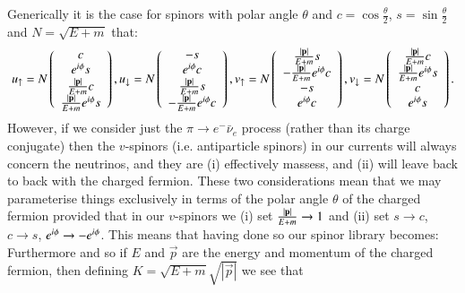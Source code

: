 \begin{allparts}
Generically it is the case for spinors with polar angle $\theta$ and $c=\cos{\frac \theta 2}$, $s=\sin {\frac \theta 2}$ and $N=\sqrt{E+m}$ that:
$$
u_\uparrow =N\left(\begin{array}{c} c \\ e^{i\phi} s \\ \frac{|{\bf p}|}{E+m} c \\ \frac{|{\bf p}|}{E+m} e^{i\phi} s \end{array}\right),
u_\downarrow=N\left(\begin{array}{c} -s \\ e^{i\phi} c \\ \frac{|{\bf p}|}{E+m} s \\ -\frac{|{\bf p}|}{E+m} e^{i\phi} c \end{array}\right),
v_\uparrow =N\left(\begin{array}{c} \frac{|{\bf p}|}{E+m} s \\ -\frac{|{\bf p}|}{E+m} e^{i\phi} c \\ -s \\ e^{i\phi} c \end{array}\right),
v_\downarrow=N\left(\begin{array}{c} \frac{|{\bf p}|}{E+m} c \\ \frac{|{\bf p}|}{E+m} e^{i\phi} s \\ c \\ e^{i\phi} s \end{array}\right).
$$
However, if we consider just the $\pi\rightarrow e^-\bar \nu_e$ process (rather than its charge conjugate) then the $v$-spinors (i.e. antiparticle spinors) in our currents will always concern the neutrinos, and they are (i) effectively massess, and (ii) will leave back to back with the charged fermion.  These two considerations mean that we may parameterise things exclusively in terms of the polar angle $\theta$ of the charged fermion provided that in our $v$-spinors we (i) set $\frac{|{\bf p}|}{E+m}\rightarrow 1$ and (ii) set $s\rightarrow c$, $c\rightarrow s$, $e^{i\phi}\rightarrow -e^{i\phi}$.  This means that having done so our  spinor library becomes:
Furthermore
and so if $E$ and $\vec p$ are the energy and momentum of the charged fermion, then defining $K=\sqrt{E+m}{\sqrt{|\vec p|}}$ we see that
\end{allparts}
